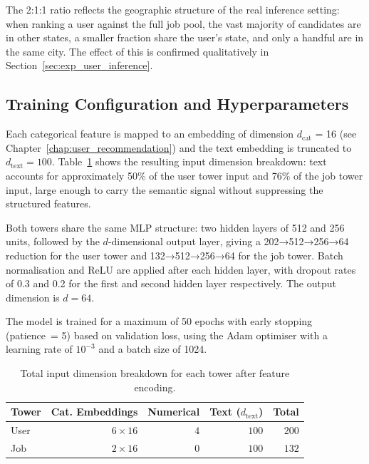 The 2:1:1 ratio reflects the geographic structure of the real inference 
setting: when ranking a user against the full job pool, the vast majority 
of candidates are in other states, a smaller fraction share the user's 
state, and only a handful are in the same city. The effect of 
this is confirmed qualitatively in Section~\ref{sec:exp_user_inference}.

\subsection{Training Configuration and Hyperparameters}
\label{sec:exp_user_hyperparameters}

Each categorical feature is mapped to an embedding of dimension $d_{\text{cat}}$ = 16 (see Chapter~\ref{chap:user_recommendation}) and 
the text embedding is truncated to $d_{\text{text}} = 100$. 
Table~\ref{tab:tower_input_dims} shows the resulting input dimension 
breakdown: text accounts for approximately 50\% of the user tower 
input and 76\% of the job tower input, large enough to carry the 
semantic signal without suppressing the structured features.

Both towers share the same MLP structure: two hidden layers of 512 and 
256 units, followed by the $d$-dimensional output layer, giving a 
202→512→256→64 reduction for the user tower and 132→512→256→64 for 
the job tower. Batch normalisation and ReLU are applied after each 
hidden layer, with dropout rates of 0.3 and 0.2 for the first and 
second hidden layer respectively. The output dimension is $d = 64$.

The model is trained for a maximum of 50 epochs with early stopping 
(patience~= 5) based on validation loss, using the Adam optimiser 
with a learning rate of $10^{-3}$ and a batch size of 1024.
\begin{table}[htbp]
    \centering
    \caption{Total input dimension breakdown for each tower after feature encoding.}
    \label{tab:tower_input_dims}
    \begin{tabular}{lrrrr}
        \toprule
        \textbf{Tower} & \textbf{Cat. Embeddings} & \textbf{Numerical} 
                       & \textbf{Text ($d_{\text{text}}$)} & \textbf{Total} \\
        \midrule 
        User & $6 \times 16$ & $4$ & $100$ & $200$ \\
        Job  & $2 \times 16$ & $0$ & $100$ & $132$ \\
        \bottomrule
    \end{tabular}
\end{table}
